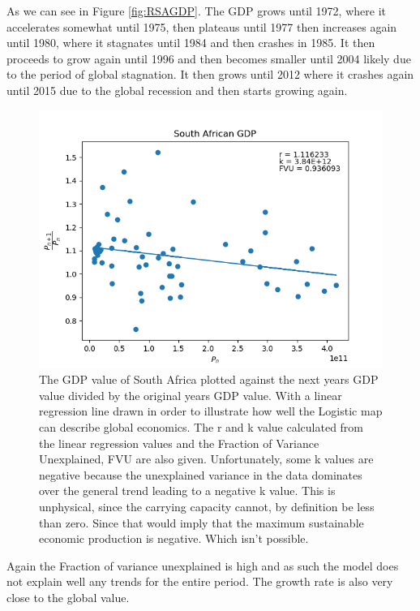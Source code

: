 \documentclass[11pt,a4paper]{CLabBookTemplate} %
\begin{document}
As we can see in Figure \ref{fig:RSAGDP}. The GDP grows until 1972, where it accelerates somewhat until 1975, then plateaus until 1977 then increases again until 1980, where it stagnates until 1984 and then crashes in 1985. It then proceeds to grow again until 1996 and then becomes smaller until 2004 likely due to the period of global stagnation. It then grows until 2012 where it crashes again until 2015 due to the global recession and then starts growing again. 
\begin{figure}[h!]
	\centering
	\includegraphics[width = 120mm]{Figures/RSAGDPScatter.png}
	\caption{The GDP value of South Africa plotted against the next years GDP value divided by the original years GDP value. With a linear regression line drawn in order to illustrate how well the Logistic map can describe global economics. The r and k value calculated from the linear regression values and the Fraction of Variance Unexplained, FVU are also given. Unfortunately, some k values are negative because the unexplained variance in the data dominates over the general trend leading to a negative k value. This is unphysical, since the carrying capacity cannot, by definition be less than zero. Since that would imply that the maximum sustainable economic production is negative. Which isn't possible.}
	\label{fig:RSAGDPScatter}
\end{figure}
Again the Fraction of variance unexplained is high and as such the model does not explain well any trends for the entire period. The growth rate is also very close to the global value. 
\end{document}
